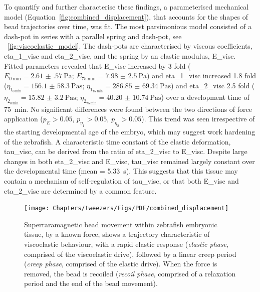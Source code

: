 To quantify and further characterise these findings, a parameterised mechanical model (Equation~\eqref{fig:combined_displacement}), that accounts for the shapes of bead trajectories over time, was fit.
The most parsimonious model consisted of a dash-pot in series with a parallel spring and dash-pot, see \figurename~\ref{fig:viscoelastic_model}.
The dash-pots are characterised by viscous coefficients, \gls{eta_1_visc} and \gls{eta_2_visc}, and the spring by an elastic modulus, \gls{E_visc}.
Fitted parameters revealed that \gls{E_visc} increased by 3 fold
(\(E_{\SI{0}{\minute}}=\SI{2.61(57)}{\pascal}\);
\(E_{\SI{75}{\minute}}=\SI{7.98(250)}{\pascal}\))
and \gls{eta_1_visc} increased 1.8 fold
(\(\eta_{1_{\SI{0}{\minute}}}=\SI{156.1(583)}{\pascal\second}\);
\(\eta_{1_{\SI{75}{\minute}}}=\SI{286.85(6934)}{\pascal\second}\))
and \gls{eta_2_visc} 2.5 fold
(\(\eta_{2_{\SI{0}{\minute}}}=\SI{15.82(320)}{\pascal\second}\);
\(\eta_{2_{\SI{75}{\minute}}}=\SI{40.20(1074)}{\pascal\second}\))
over a development time of \SI{75}{\minute}.
No significant differences were found between the two directions of force application
(\(p_E > 0.05\), \(p_{\eta_1} > 0.05\), \(p_{\eta_2} > 0.05\)).
This trend was seen irrespective of the starting developmental age of the embryo, which may suggest work hardening of the \gls{zebrafish}. %
A characteristic time constant of the elastic deformation, \gls{tau_visc}, can be derived from the ratio of \gls{eta_2_visc} to \gls{E_visc}.
Despite large changes in both \gls{eta_2_visc} and \gls{E_visc}, \gls{tau_visc} remained largely constant over the developmental time (mean = \SI{5.33}{\second}).
This suggests that this tissue may contain a mechanism of self-regulation of \gls{tau_visc}, or that both \gls{E_visc} and \gls{eta_2_visc} are determined by a common feature.

\begin{figure}
 \centering
 \texttt{[image: Chapters/tweezers/Figs/PDF/combined\_displacement]}
 \caption[Superraramagnetic bead movement within \gls{zebrafish} embryonic tissue]{
 Superraramagnetic bead movement within \gls{zebrafish} embryonic tissue, by a known force, shows a trajectory characteristic of viscoelastic behaviour, with a rapid elastic response (\emph{elastic phase}, comprised of the viscoelastic drive), followed by a linear creep period (\emph{creep phase}, comprised of the elastic drive). When the force is removed, the bead is recoiled (\emph{recoil phase}, comprised of a relaxation period and the end of the bead movement).
 }\label{fig:combined_displacement}
\end{figure}

